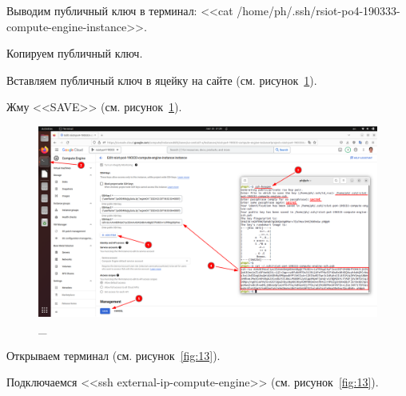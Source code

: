 \documentclass[12pt, a4paper, simple]{eskdtext}
\begin{document}
  Выводим публичный ключ в терминал: <<cat /home/ph/.ssh/rsiot-po4-190333-compute-engine-instance>>.

  Копируем публичный ключ.

  Вставляем публичный ключ в яцейку на сайте (см. рисунок~\ref{fig:12}).

  Жму <<SAVE>> (см. рисунок~\ref{fig:12}).

  \begin{figure}[!h]
    \centering
    \includegraphics[width=18cm]
    {images/2023-02-25_21-32-41.png}
    \caption{\_}
    \label{fig:12}
  \end{figure}

  Открываем терминал (см. рисунок~\ref{fig:13}).

  Подключаемся <<ssh external-ip-compute-engine>> (см. рисунок~\ref{fig:13}).
\end{document}
